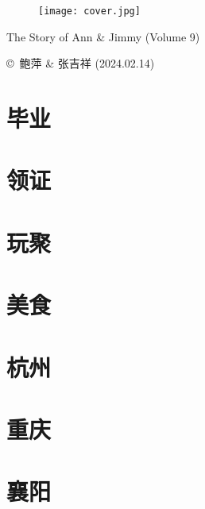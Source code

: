 \documentclass{book}
\begin{document}
	\clearpage
	\begin{figure}
		\texttt{[image: cover.jpg]}
	\end{figure}
	
	\clearpage
	\begin{center}
		{\Huge The Story of Ann \& Jimmy (Volume 9)}
	\end{center}
	\vspace*{\fill}
	\copyright \ 鲍萍 \& 张吉祥 (2024.02.14)

	\tableofcontents
	
	\chapter{毕业}
	
	
	\chapter{领证}
	

	\chapter{玩聚}
	
	
	\chapter{美食}
	
	
	\chapter{杭州}
	
	
	\chapter{重庆}
	
	
	\chapter{襄阳}
	
\end{document}
